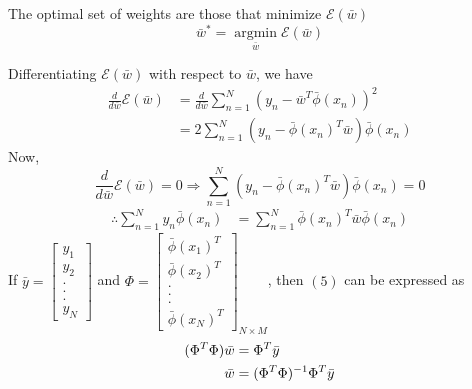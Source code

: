 \documentclass[a4paper,12pt]{article}
\begin{document}
The optimal set of weights are those that minimize $\mathcal{E}(\bar{w})$
\[ \bar{w}^* = \displaystyle\operatorname*{argmin}_{\bar{w}} \mathcal{E}(\bar{w}) \]

Differentiating $\mathcal{E}(\bar{w})$ with respect to $\bar{w}$, we have
\begin{align*}
 \frac{d}{d\bar{w}}\mathcal{E}(\bar{w}) &= \frac{d}{d\bar{w}}\sum_{n=1}^N (y_n-\bar{w}^T \bar{\phi}(x_n))^2 \\
					 &= 2 \sum_{n=1}^N (y_n- \bar{\phi}(x_n)^T\bar{w})\bar{\phi}(x_n) 
\end{align*}
Now,
\[ \frac{d}{d\bar{w}}\mathcal{E}(\bar{w}) = 0 \Rightarrow \sum_{n=1}^N (y_n - \bar{\phi}(x_n)^T\bar{w})\bar{\phi}(x_n) = 0 \]
\begin{align}
\therefore \sum_{n=1}^N y_n \bar{\phi}(x_n) &= \sum_{n=1}^N \bar{\phi}(x_n)^T \bar{w} \bar{\phi}(x_n)
\end{align}
If $
    \bar{y} = \left[ 
		      \begin{array}{c}
		       y_1 \\ y_2 \\ . \\ . \\ . \\ y_N
		      \end{array}
	      \right]
   $
 and $
      \Phi = \left[
		      \begin{array}{c}
		       \bar{\phi}(x_1)^T \\ \bar{\phi}(x_2)^T \\ . \\ . \\. \\ \bar{\phi}(x_N)^T
		      \end{array}
	     \right]_{N\times M} 
     $,
then $(5)$ can be expressed as
\begin{align}
(\Phi^T \Phi) \bar{w} &= \Phi^T \bar{y} \notag \\
	      \bar{w} &= (\Phi^T \Phi)^{-1} \Phi^T \bar{y}
\end{align}
\end{document}
